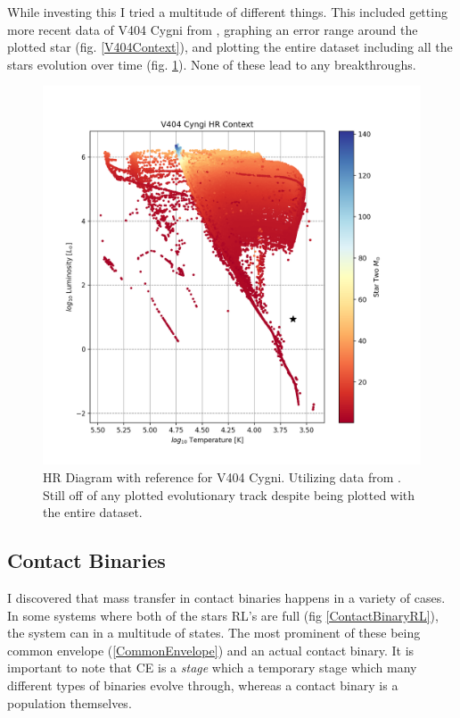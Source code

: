 \documentclass[12pt, a4paper]{article}
\begin{document}
            While investing this I tried a multitude of different things. This included getting more recent data of V404 Cygni from \parencite{Bartolomeo_2023}, graphing an error range around the plotted star (fig. \ref{V404Context}), and plotting the entire dataset including all the stars evolution over time (fig. \ref{V404FullContextTesting}). None of these lead to any breakthroughs. 

            \begin{figure}[H] 
                \centering
                \includegraphics[scale = .6]{figs/GeneratedFigs/V404_Cygni/V404EntireDatasetPopulationHRComp.png}
                \caption{HR Diagram with reference for V404 Cygni. Utilizing data from \parencite{Bartolomeo_2023}. Still off of any plotted evolutionary track despite being plotted with the entire dataset.}
                \label{V404FullContextTesting}
            \end{figure}

        \subsection{Contact Binaries}
            I discovered that mass transfer in contact binaries happens in a variety of cases. In some systems where both of the stars RL's are full (fig \ref{ContactBinaryRL}), the system can in a multitude of states. The most prominent of these being common envelope (\ref{CommonEnvelope}) and an actual contact binary. It is important to note that CE is a \textit{stage} which a temporary stage which many different types of binaries evolve through, whereas a contact binary is a population themselves.
\end{document}
